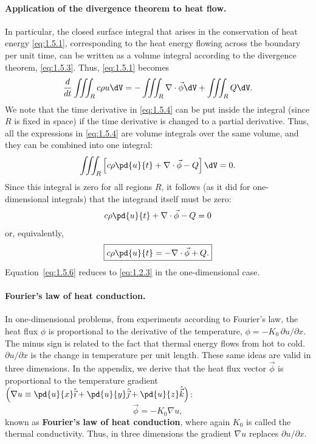 \paragraph{Application of the divergence theorem to heat flow.}
In particular, the closed surface integral that arises in the conservation of heat energy \eqref{eq:1.5.1}, corresponding to the heat energy flowing across the boundary per unit time, can be written as a volume integral according to the divergence theorem, \eqref{eq:1.5.3}. Thus, \eqref{eq:1.5.1} becomes
\begin{equation}
\frac{d}{d t}\iiint_R c\rho u\dV = -\iiint_R \nabla\cdot\vec{\phi}\dV + \iiint_R Q\dV.
\label{eq:1.5.4}
\end{equation}
We note that the time derivative in \eqref{eq:1.5.4} can be put inside the integral (since $R$ is fixed in space) if the time derivative is changed to a partial derivative. Thus, all the expressions in \eqref{eq:1.5.4} are volume integrals over the same volume, and they can be combined into one integral:
\begin{equation}
\iiint_R \left[c\rho\pd{u}{t} + \nabla\cdot\vec{\phi} - Q\right]\dV = 0.
\label{eq:1.5.5}
\end{equation}
Since this integral is zero for all regions $R$, it follows (as it did for one-dimensional integrals) that the integrand itself must be zero:
\[
c\rho\pd{u}{t} + \nabla\cdot\vec{\phi} - Q = 0
\]
or, equivalently,
\begin{equation}
\boxed{c\rho\pd{u}{t} = -\nabla\cdot\vec{\phi} + Q.}
\label{eq:1.5.6}
\end{equation}
Equation~\eqref{eq:1.5.6} reduces to \eqref{eq:1.2.3} in the one-dimensional case.

\paragraph{Fourier's law of heat conduction.}
In one-dimensional problems, from experiments according to Fourier's law, the heat flux $\phi$ is proportional to the derivative of the temperature, $\phi = -K_0\,\partial u/\partial x$. The minus sign is related to the fact that thermal energy flows from hot to cold. $\partial u/\partial x$ is the change in temperature per unit length. These same ideas are valid in three dimensions. In the appendix, we derive that the heat flux vector $\vec{\phi}$ is proportional to the temperature gradient $\left(\nabla u \equiv \pd{u}{x}\hat{\vec{\imath}} + \pd{u}{y}\hat{\vec{\jmath}} + \pd{u}{z}\hat{\vec{k}}\right)$:
\begin{equation}
\boxed{\vec{\phi} = -K_0\nabla u,}
\label{eq:1.5.7}
\end{equation}
known as \textbf{Fourier's law of heat conduction}, where again $K_0$ is called the thermal conductivity. Thus, in three dimensions the gradient $\nabla u$ replaces $\partial u/\partial x$.

